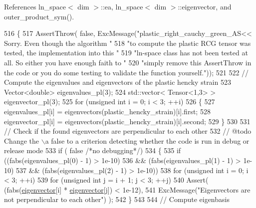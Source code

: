 References ln\+\_\+space$<$ dim $>$\+::ea, ln\+\_\+space$<$ dim $>$\+::eigenvector, and outer\+\_\+product\+\_\+sym().


\begin{DoxyCode}
516 \{
517     AssertThrow( \textcolor{keyword}{false}, ExcMessage(\textcolor{stringliteral}{"plastic\_right\_cauchy\_green\_AS<< Sorry. Even though the algorithm "}
518                                    \textcolor{stringliteral}{"to compute the plastic RCG tensor was tested, the implementation into
       this "}
519                                    \textcolor{stringliteral}{"ln-space class has not been tested at all. So either you have enough
       faith to "}
520                                    \textcolor{stringliteral}{"simply remove this AssertThrow in the code or you do some testing to
       validate the function yourself."}));
521 
522     \textcolor{comment}{// Compute the eigenvalues and eigenvectors of the plastic hencky strain}
523      Vector<double> eigenvalues\_pl(3);
524      std::vector< Tensor<1,3> > eigenvector\_pl(3);
525      \textcolor{keywordflow}{for} (\textcolor{keywordtype}{unsigned} \textcolor{keywordtype}{int} i = 0; i < 3; ++i)
526      \{
527         eigenvalues\_pl[i] = eigenvectors(plastic\_hencky\_strain)[i].first;
528         eigenvector\_pl[i] = eigenvectors(plastic\_hencky\_strain)[i].second;
529      \}
530 
531     \textcolor{comment}{// Check if the found eigenvectors are perpendicular to each other}
532     \textcolor{comment}{// @todo Change the \(\backslash\)a false to a criterion detecting whether the code is run in debug or release mode}
533      \textcolor{keywordflow}{if} ( \textcolor{keyword}{false} \textcolor{comment}{/*no debugging*/})
534      \{
535         \textcolor{keywordflow}{if} ((fabs(eigenvalues\_pl(0) - 1) > 1e-10)
536                 && (fabs(eigenvalues\_pl(1) - 1) > 1e-10)
537                 && (fabs(eigenvalues\_pl(2) - 1) > 1e-10))
538             \textcolor{keywordflow}{for} (\textcolor{keywordtype}{unsigned} \textcolor{keywordtype}{int} i = 0; i < 3; ++i)
539                 \textcolor{keywordflow}{for} (\textcolor{keywordtype}{unsigned} \textcolor{keywordtype}{int} j = i + 1; j < 3; ++j)
540                     Assert( (fabs(\hyperlink{classln__space_ada3f56f8a97f974275c267ac172a0b40}{eigenvector}[i] * \hyperlink{classln__space_ada3f56f8a97f974275c267ac172a0b40}{eigenvector}[j]) < 1e-12),
541                             ExcMessage(\textcolor{stringliteral}{"Eigenvectors are not perpendicular to each other"}) );
542      \}
543 
544     \textcolor{comment}{// Compute eigenbasis}

\end{DoxyCode}
